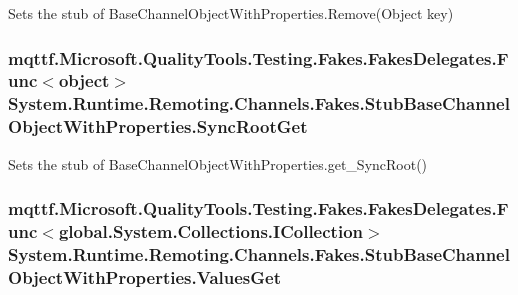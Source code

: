 Sets the stub of Base\-Channel\-Object\-With\-Properties.\-Remove(\-Object key)

\hypertarget{class_system_1_1_runtime_1_1_remoting_1_1_channels_1_1_fakes_1_1_stub_base_channel_object_with_properties_aa625d021bcf15fe6aa2b61ace41d7256}{
\subsubsection[{Sync\-Root\-Get}]{\setlength{\rightskip}{0pt plus 5cm}mqttf.\-Microsoft.\-Quality\-Tools.\-Testing.\-Fakes.\-Fakes\-Delegates.\-Func$<$object$>$ System.\-Runtime.\-Remoting.\-Channels.\-Fakes.\-Stub\-Base\-Channel\-Object\-With\-Properties.\-Sync\-Root\-Get}}\label{class_system_1_1_runtime_1_1_remoting_1_1_channels_1_1_fakes_1_1_stub_base_channel_object_with_properties_aa625d021bcf15fe6aa2b61ace41d7256}


Sets the stub of Base\-Channel\-Object\-With\-Properties.\-get\-\_\-\-Sync\-Root()

\hypertarget{class_system_1_1_runtime_1_1_remoting_1_1_channels_1_1_fakes_1_1_stub_base_channel_object_with_properties_a635c382c176c48a458b3874207497460}{
\subsubsection[{Values\-Get}]{\setlength{\rightskip}{0pt plus 5cm}mqttf.\-Microsoft.\-Quality\-Tools.\-Testing.\-Fakes.\-Fakes\-Delegates.\-Func$<$global.\-System.\-Collections.\-I\-Collection$>$ System.\-Runtime.\-Remoting.\-Channels.\-Fakes.\-Stub\-Base\-Channel\-Object\-With\-Properties.\-Values\-Get}}\label{class_system_1_1_runtime_1_1_remoting_1_1_channels_1_1_fakes_1_1_stub_base_channel_object_with_properties_a635c382c176c48a458b3874207497460}



